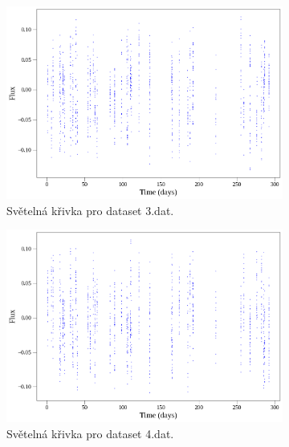 \documentclass[a4paper,11pt,twocolumn]{article}
\begin{document}
\begin{figure}
\begin{subfigure}[t]{0.48\textwidth}
            \centering
            \includegraphics[width=\textwidth]{lc/3_lc.png}
            \caption{Světelná křivka pro dataset 3.dat.}
            \label{fig:3_lc}
        \end{subfigure}
        \vspace{10pt}
        \begin{subfigure}[t]{0.48\textwidth}
            \centering
            \includegraphics[width=\textwidth]{lc/4_lc.png}
            \caption{Světelná křivka pro dataset 4.dat.}
            \label{fig:4_lc}
        \end{subfigure}
        \hfill
        \begin{subfigure}[t]{0.48\textwidth}
            \centering

\end{subfigure}
\end{figure}
\end{document}
